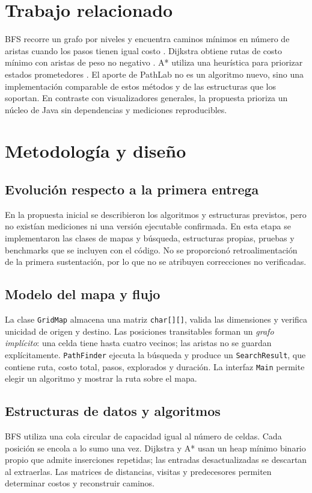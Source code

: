 \documentclass[conference]{IEEEtran}
\begin{document}
\section{Trabajo relacionado}
BFS recorre un grafo por niveles y encuentra caminos m\'inimos en n\'umero de aristas cuando los pasos tienen igual costo \cite{goodrich}. Dijkstra obtiene rutas de costo m\'inimo con aristas de peso no negativo \cite{dijkstra}. A* utiliza una heur\'istica para priorizar estados prometedores \cite{astar}. El aporte de PathLab no es un algoritmo nuevo, sino una implementaci\'on comparable de estos m\'etodos y de las estructuras que los soportan. En contraste con visualizadores generales, la propuesta prioriza un n\'ucleo de Java sin dependencias y mediciones reproducibles.

\section{Metodolog\'ia y dise\~no}
\subsection{Evoluci\'on respecto a la primera entrega}
En la propuesta inicial se describieron los algoritmos y estructuras previstos, pero no exist\'ian mediciones ni una versi\'on ejecutable confirmada. En esta etapa se implementaron las clases de mapas y b\'usqueda, estructuras propias, pruebas y benchmarks que se incluyen con el c\'odigo. No se proporcion\'o retroalimentaci\'on de la primera sustentaci\'on, por lo que no se atribuyen correcciones no verificadas.

\subsection{Modelo del mapa y flujo}
La clase \texttt{GridMap} almacena una matriz \texttt{char[][]}, valida las dimensiones y verifica unicidad de origen y destino. Las posiciones transitables forman un \emph{grafo impl\'icito}: una celda tiene hasta cuatro vecinos; las aristas no se guardan expl\'icitamente. \texttt{PathFinder} ejecuta la b\'usqueda y produce un \texttt{SearchResult}, que contiene ruta, costo total, pasos, explorados y duraci\'on. La interfaz \texttt{Main} permite elegir un algoritmo y mostrar la ruta sobre el mapa.

\subsection{Estructuras de datos y algoritmos}
BFS utiliza una cola circular de capacidad igual al n\'umero de celdas. Cada posici\'on se encola a lo sumo una vez. Dijkstra y A* usan un heap m\'inimo binario propio que admite inserciones repetidas; las entradas desactualizadas se descartan al extraerlas. Las matrices de distancias, visitas y predecesores permiten determinar costos y reconstruir caminos.
\end{document}
